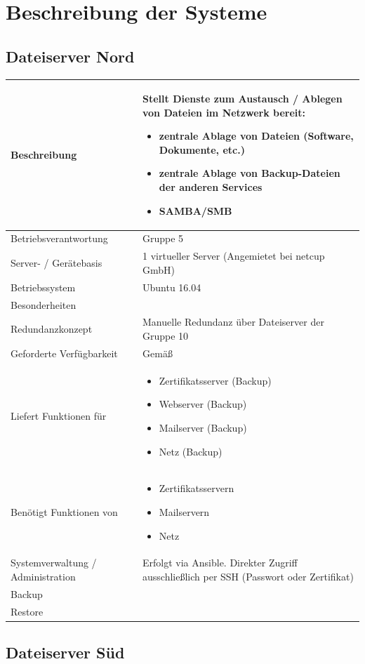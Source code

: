 \documentclass[]{article}
\date{}
\begin{document}
\section{Beschreibung der Systeme}\label{beschreibung-der-systeme}

\subsection{Dateiserver Nord}\label{dateiserver-nord}

\begin{longtable}{|l|p{6cm}|}
\toprule
Beschreibung & Stellt Dienste zum Austausch / Ablegen von Dateien im
Netzwerk bereit:

\begin{itemize}
\item
  zentrale Ablage von Dateien (Software, Dokumente, etc.)
\item
  zentrale Ablage von Backup-Dateien der anderen Services
\item
  SAMBA/SMB
\end{itemize}\tabularnewline
\midrule
Betriebsverantwortung & Gruppe 5\tabularnewline
Server- / Gerätebasis & 1 virtueller Server (Angemietet bei netcup
GmbH)\tabularnewline
Betriebssystem & Ubuntu 16.04\tabularnewline
Besonderheiten &\tabularnewline
Redundanzkonzept & Manuelle Redundanz über Dateiserver der Gruppe
10\tabularnewline
Geforderte Verfügbarkeit & Gemäß\tabularnewline
Liefert Funktionen für & \begin{itemize}
\item
  Zertifikatsserver (Backup)
\item
  Webserver (Backup)
\item
  Mailserver (Backup)
\item
  Netz (Backup)
\end{itemize}\tabularnewline
Benötigt Funktionen von & \begin{itemize}
\item
  Zertifikatsservern
\item
  Mailservern
\item
  Netz
\end{itemize}\tabularnewline
Systemverwaltung / Administration & Erfolgt via Ansible. Direkter Zugriff ausschließlich per SSH (Passwort oder Zertifikat)\tabularnewline
Backup &\tabularnewline
Restore &\tabularnewline
\bottomrule
\end{longtable}

\newpage

\subsection{Dateiserver Süd}\label{dateiserver-suxfcd}
\end{document}
